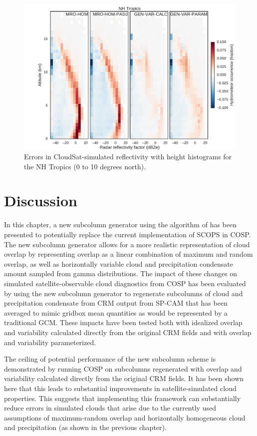 \begin{figure}
\centering
\includegraphics[width=\columnwidth]{graphics/subgrid2_cfadDbze94_NHTropics_all_diff.pdf}
\caption{Errors in CloudSat-simulated reflectivity with height histograms for the NH Tropics (0 to 10 degrees north).}
\label{subgrid2_cfadDbze94_NHTropics_all_diff}
\end{figure}

\section{Discussion}
\label{subgrid2_discussion_section}
In this chapter, a new subcolumn generator using the algorithm of \cite{raisanen_et_al_2004} has been presented to potentially replace the current implementation of SCOPS in COSP. The new subcolumn generator allows for a more realistic representation of cloud overlap by representing overlap as a linear combination of maximum and random overlap, as well as horizontally variable cloud and precipitation condensate amount sampled from gamma distributions. The impact of these changes on simulated satellite-observable cloud diagnostics from COSP has been evaluated by using the new subcolumn generator to regenerate subcolumns of cloud and precipitation condensate from CRM output from SP-CAM that has been averaged to mimic gridbox mean quantities as would be represented by a traditional GCM. These impacts have been tested both with idealized overlap and variability calculated directly from the original CRM fields and with overlap and variability parameterized.

The ceiling of potential performance of the new subcolumn scheme is demonstrated by running COSP on subcolumns regenerated with overlap and variability calculated directly from the original CRM fields. It has been shown here that this leads to substantial improvements in satellite-simulated cloud properties. This suggests that implementing this framework can substantially reduce errors in simulated clouds that arise due to the currently used assumptions of maximum-random overlap and horizontally homogeneous cloud and precipitation (as shown in the previous chapter).

